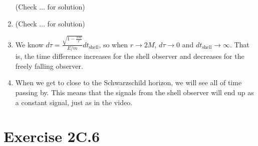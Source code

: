 \documentclass[a4paper,10pt,english]{article}
\begin{document}
\begin{enumerate}
(Check $\ldots$ for solution) 

\item (Check $\ldots$ for solution) 

\item We know $d\tau=\frac{\sqrt{1-\frac{2M}{r}}}{E/m}dt_{\text{shell}}$, so when $r\to2M$, $d\tau\to0$ and $dt_{\text{shell}}\to\infty$. That is, the time difference increases for the shell observer and decreases for the freely falling observer.

\item When we get to close to the Schwarzschild horizon, we will see all of time passing by. This means that the signals from the shell observer will end up as a constant signal, just as in the video.

\end{enumerate}








\section*{Exercise 2C.6}
\end{document}
